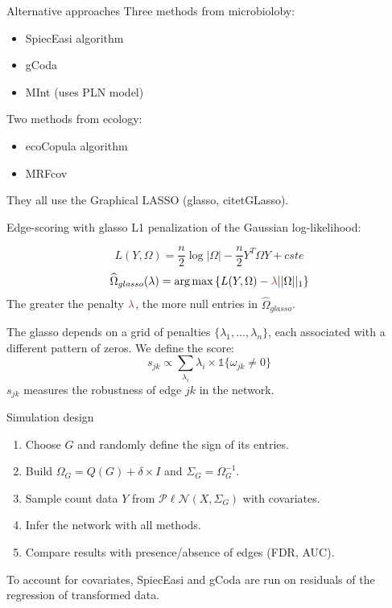 \documentclass[11pt]{beamer}
\newcommand{\emphase}[1]{\textcolor{Complement}{#1}}
\begin{document}
 
\begin{frame}{Alternative approaches}
 Three methods  from microbioloby:\\
    \begin{itemize}
        \item \emphase{SpiecEasi} algorithm \citet{kurtz} 
        \item \emphase{gCoda} \citet{gcoda} 
        \item \emphase{MInt} \citet{MInt} (uses PLN model)
    \end{itemize}\bigskip

 Two methods  from ecology:\\
    \begin{itemize}
        \item \emphase{ecoCopula} algorithm \citet{PHW18} 
        \item \emphase{MRFcov} \citet{CWL18} 
    \end{itemize}\bigskip
    
    They all use the Graphical LASSO (glasso, citet{GLasso}).
\end{frame}
\begin{frame}{Edge-scoring with glasso}
L1 penalization of the Gaussian log-likelihood:
 
 \[L(Y,\Omega) = \frac{n}{2}\log |\Omega|-\frac{n}{2} Y^T\Omega Y + cste\]
\[\widehat{\Omega}_{glasso}(\lambda) = \arg\max\left\{ L(Y,\Omega)-\emphase{\lambda} ||\Omega||_1 \right\} \]
The greater the penalty $\emphase{\lambda}$, the more null entries in $\widehat{\Omega}_{glasso}$.\\
\bigskip

The glasso depends on a grid of penalties $\{\lambda_1,...,\lambda_n\}$, each associated with  a different pattern of zeros. We define the score:
\emphase{$$s_{jk}\propto \sum_{\lambda_i} \lambda_i \times \mathds{1}\{\omega_{jk} \neq 0\}$$}
$s_{jk}$ measures the robustness of edge $jk$ in the network.
\end{frame}

\begin{frame}{Simulation design}
\begin{enumerate}
     \item Choose  \emphase{$G$} and randomly define the sign of its entries.
     \item Build \emphase{$\Omega_G=Q(G)+\delta\times I$} and $\Sigma_G=\Omega_G^{-1}$.
     \item Sample count data \emphase{$Y$} from $\mathcal{P\ell N}(X,\Sigma_G)$ with \emphase{covariates}.
     \item Infer the network with all methods.
     \item Compare results with  presence/absence of edges (\emphase{FDR}, \emphase{AUC}).
\end{enumerate}
\bigskip

To account for covariates, SpiecEasi and gCoda are run on residuals of the regression of transformed data.
\end{frame}
\end{document}
